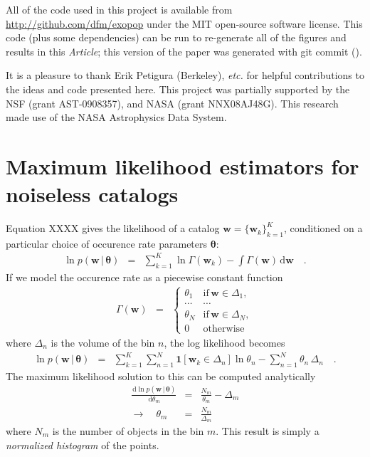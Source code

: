 \documentclass[12pt,preprint]{aastex}
\newcommand{\project}[1]{{\sffamily #1}}
\newcommand{\paper}{\textsl{Article}}
\newcommand{\foreign}[1]{\emph{#1}}
\newcommand{\etc}{\foreign{etc.}}
\newcommand{\sectlabel}[1]{\label{sect:#1}}
\newcommand{\dd}{\ensuremath{\,\mathrm{d}}}
\newcommand{\bvec}[1]{\ensuremath{\boldsymbol{#1}}}
\newcommand{\rate}{\ensuremath{\Gamma}}
\newcommand{\ratepar}{{\ensuremath{\theta}}}
\newcommand{\ratepars}{{\ensuremath{\bvec{\ratepar}}}}
\newcommand{\entry}{{\ensuremath{\bvec{w}}}}
\newcommand{\catalog}{{\ensuremath{\bvec{\entry}}}}
\newcommand{\binarea}{{\ensuremath{\Delta}}}
\begin{document}
All of the code used in this project is available from
\url{http://github.com/dfm/exopop} under the MIT open-source software license.
This code (plus some dependencies) can be run to re-generate all of the
figures and results in this \paper; this version of the paper was generated
with git commit \texttt{\githash} (\gitdate).

\acknowledgments
It is a pleasure to thank
    Erik Petigura (Berkeley),
    \etc
for helpful contributions to the ideas and code presented here.
This project was partially supported by the NSF (grant AST-0908357), and NASA
(grant NNX08AJ48G).
This research made use of the NASA \project{Astrophysics Data System}.

\appendix

\section{Maximum likelihood estimators for noiseless catalogs}
\sectlabel{histogram}

Equation XXXX gives the likelihood of a catalog $\catalog =
\{\entry_k\}_{k=1}^K$, conditioned on a particular choice of occurence rate
parameters \ratepars:
\begin{eqnarray}
\ln p(\catalog\,|\,\ratepars) &=& \sum_{k=1}^K \ln \rate(\entry_k)
    - \int \rate(\entry) \dd\entry \quad.
\end{eqnarray}
If we model the occurence rate as a piecewise constant function
\begin{eqnarray}
\rate (\entry) &=& \left \{\begin{array}{ll}
\ratepar_1 & \mathrm{if\,} \entry \in \binarea_1, \\
\cdots & \cdots \\
\ratepar_N & \mathrm{if\,} \entry \in \binarea_N, \\
0 & \mathrm{otherwise}
\end{array}\right.
\end{eqnarray}
where $\binarea_n$ is the volume of the bin $n$, the log likelihood becomes
\begin{eqnarray}
\ln p(\catalog\,|\,\ratepars) &=&
    \sum_{k=1}^K \sum_{n=1}^N \mathbf{1}[\entry_k \in \binarea_n]
        \ln\ratepar_n
    - \sum_{n=1}^N \ratepar_n\,\binarea_n \quad.
\end{eqnarray}
The maximum likelihood solution to this can be computed analytically
\begin{eqnarray}
\frac{\dd \ln p(\catalog\,|\,\ratepars)}{\dd \ratepar_m} &=&
    \frac{N_m}{\ratepar_m} - \binarea_m \\
\to \quad \ratepar_m &=& \frac{N_m}{\binarea_m}
\end{eqnarray}
where $N_m$ is the number of objects in the bin $m$.
This result is simply a \emph{normalized histogram} of the points.
\end{document}
